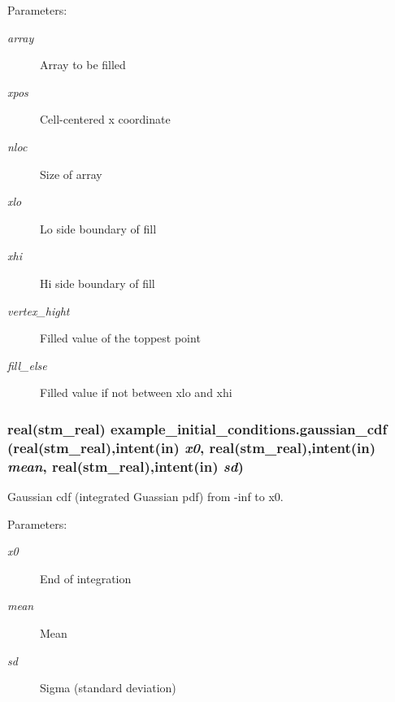 \begin{Desc}
\item[Parameters:]
\begin{description}
\item[{\em array}]Array to be filled\item[{\em xpos}]Cell-centered x coordinate\item[{\em nloc}]Size of array\item[{\em xlo}]Lo side boundary of fill\item[{\em xhi}]Hi side boundary of fill\item[{\em vertex\_\-hight}]Filled value of the toppest point\item[{\em fill\_\-else}]Filled value if not between xlo and xhi \end{description}
\end{Desc}
\hypertarget{a00059_1a28e5a6ef3e6bb0552f3cd0a195fb6f}{
\subsubsection[{gaussian\_\-cdf}]{\setlength{\rightskip}{0pt plus 5cm}real(stm\_\-real) example\_\-initial\_\-conditions.gaussian\_\-cdf (real(stm\_\-real),intent(in) {\em x0}, \/  real(stm\_\-real),intent(in) {\em mean}, \/  real(stm\_\-real),intent(in) {\em sd})}}
\label{a00059_1a28e5a6ef3e6bb0552f3cd0a195fb6f}


Gaussian cdf (integrated Guassian pdf) from -inf to x0. 

\begin{Desc}
\item[Parameters:]
\begin{description}
\item[{\em x0}]End of integration\item[{\em mean}]Mean\item[{\em sd}]Sigma (standard deviation) \end{description}
\end{Desc}
